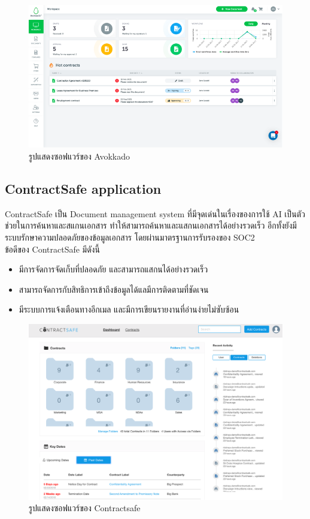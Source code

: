 \documentclass[12pt,oneside,openright,a4paper]{cpe-thai-project}
\begin{document}
\begin{figure}[!h]\centering
  \includegraphics[width=13cm]{./assets/avokkado.png}
  \caption{รูปแสดงซอฟแวร์ของ Avokkado}\label{fig:avokkado}
\end{figure}

\newpage
\subsection{ContractSafe application}
\hspace*{1cm} ContractSafe \cite{BestDMS,WhatIsContractSafe} เป็น Document management system ที่มีจุดเด่นในเรื่องของการใช้ AI เป็นตัวช่วยในการค้นหาและสแกนเอกสาร ทำให้สามารถค้นหาและแสกนเอกสารได้อย่างรวดเร็ว อีกทั้งยังมีระบบรักษาความปลอดภัยของข้อมูลเอกสาร โดยผ่านมาตรฐานการรับรองของ SOC2 \\
\hspace*{1cm} ข้อดีของ ContractSafe มีดังนี้
\begin{itemize}
  \item มีการจัดการจัดเก็บที่ปลอดภัย และสามารถแสกนได้อย่างรวดเร็ว	
  \item สามารถจัดการกับสิทธิการเข้าถึงข้อมูลได้แลมีการติดตามที่ชัดเจน
  \item มีระบบการแจ้งเตือนทางอีกเมล และมีการเขียนรายงานที่อ่านง่ายไม่ซับซ้อน
\end{itemize}

\begin{figure}[!h]\centering
  \includegraphics[width=13cm]{./assets/contractsafe.png}
  \caption{รูปแสดงซอฟแวร์ของ Contractsafe}\label{fig:contractsafe}
\end{figure}
\end{document}
